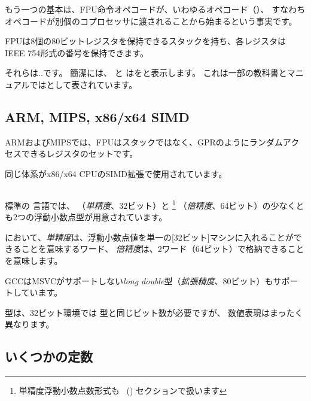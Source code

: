 もう一つの基本は、\ac{FPU}命令オペコードが、いわゆるオペコード（）、
すなわちオペコードが別個のコプロセッサに渡されることから始まるという事実です。

\label{FPU_is_stack}

FPUは8個の80ビットレジスタを保持できるスタックを持ち、各レジスタは
IEEE 754\FNURLIEEE 形式の番号を保持できます。

それらは..です。 簡潔には、 \IDA と \olly はをと表示します。
これは一部の教科書とマニュアルではとして表されています。

\subsection{ARM, MIPS, x86/x64 SIMD}

ARMおよびMIPSでは、FPUはスタックではなく、\ac{GPR}のようにランダムアクセスできるレジスタのセットです。

同じ体系がx86/x64 CPUのSIMD拡張で使用されています。

\subsection{\CCpp}


標準の \CCpp 言語では、 \Tfloat （\emph{単精度}\FNURLSP、32ビット）と 
\footnote{単精度浮動小数点数形式も 
\emph{\WorkingWithFloatAsWithStructSubSubSectionName}~() セクションで扱います}
\Tdouble （\emph{倍精度}\FNURLDP、64ビット）の少なくとも2つの浮動小数点型が用意されています。

において、\emph{単精度}は、浮動小数点値を単一の[32ビット]マシンに入れることができることを意味するワード、
\emph{倍精度}は、2ワード（64ビット）で格納できることを意味します。


GCCはMSVCがサポートしない\emph{long double}型（\emph{拡張精度}\FNURLEP、80ビット）もサポートしています。

\Tfloat 型は、32ビット環境では \Tint 型と同じビット数が必要ですが、
数値表現はまったく異なります。





\subsection{いくつかの定数}

